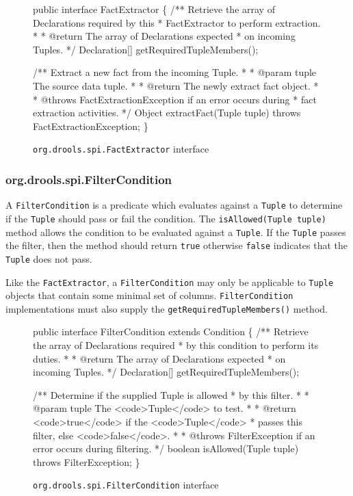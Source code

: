 \begin{figure}
\begin{codelisting}
public interface FactExtractor
\{
    /** Retrieve the array of Declarations required by this 
     *  FactExtractor to perform extraction.
     *
     *  @return The array of Declarations expected 
     *          on incoming Tuples.
     */
    Declaration[] getRequiredTupleMembers();

    /** Extract a new fact from the incoming Tuple.
     *
     *  @param tuple The source data tuple.
     *
     *  @return The newly extract fact object.
     *
     *  @throws FactExtractionException if an error occurs during
     *          fact extraction activities.
     */
    Object extractFact(Tuple tuple) throws FactExtractionException;
\}
\end{codelisting}
\label{code.FactExtractor}
\caption{\texttt{org.drools.spi.FactExtractor} interface}
\end{figure}

\subsubsection{org.drools.spi.FilterCondition}

A \verb|FilterCondition| is a predicate which evaluates against
a \verb|Tuple| to determine if the \verb|Tuple| should pass or
fail the condition. The \verb|isAllowed(Tuple tuple)| method
allows the condition to be evaluated against a \verb|Tuple|.
If the \verb|Tuple| passes the filter, then the method should
return \verb|true| otherwise \verb|false| indicates that
the \verb|Tuple| does not pass.

Like the \verb|FactExtractor|, a
\verb|FilterCondition| may only be applicable to \verb|Tuple|
objects that contain some minimal set of columns.  
\verb|FilterCondition| implementations must also supply
the \verb|getRequiredTupleMembers()| method.

\begin{figure}
\begin{codelisting}
public interface FilterCondition extends Condition
\{
    /** Retrieve the array of Declarations required
     *  by this condition to perform its duties.
     *
     *  @return The array of Declarations expected
     *          on incoming Tuples.
     */
    Declaration[] getRequiredTupleMembers();

    /** Determine if the supplied Tuple is allowed
     *  by this filter.
     *
     *  @param tuple The <code>Tuple</code> to test.
     *
     *  @return <code>true</code> if the <code>Tuple</code>
     *          passes this filter, else <code>false</code>.
     *
     *  @throws FilterException if an error occurs during filtering.
     */
    boolean isAllowed(Tuple tuple) throws FilterException;
\}
\end{codelisting}
\label{code.FilterCondition}
\caption{\texttt{org.drools.spi.FilterCondition} interface}
\end{figure}

